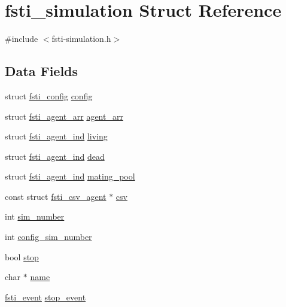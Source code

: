 \hypertarget{structfsti__simulation}{}\section{fsti\+\_\+simulation Struct Reference}
\label{structfsti__simulation}


{\ttfamily \#include $<$fsti-\/simulation.\+h$>$}

\subsection*{Data Fields}
\begin{DoxyCompactItemize}
\item 
struct \mbox{\hyperlink{structfsti__config}{fsti\+\_\+config}} \mbox{\hyperlink{structfsti__simulation_a093e3692784567c1afd416022ace5b62}{config}}
\item 
struct \mbox{\hyperlink{structfsti__agent__arr}{fsti\+\_\+agent\+\_\+arr}} \mbox{\hyperlink{structfsti__simulation_a897c352e69c8a3bd46c1a602d6380750}{agent\+\_\+arr}}
\item 
struct \mbox{\hyperlink{structfsti__agent__ind}{fsti\+\_\+agent\+\_\+ind}} \mbox{\hyperlink{structfsti__simulation_a303899c120552b30d6694f474351ac02}{living}}
\item 
struct \mbox{\hyperlink{structfsti__agent__ind}{fsti\+\_\+agent\+\_\+ind}} \mbox{\hyperlink{structfsti__simulation_a1e6af515eb855cb2fa8af101bd0f9cb8}{dead}}
\item 
struct \mbox{\hyperlink{structfsti__agent__ind}{fsti\+\_\+agent\+\_\+ind}} \mbox{\hyperlink{structfsti__simulation_a642fddbe7701bc70ce2a5e78c6c40f5a}{mating\+\_\+pool}}
\item 
const struct \mbox{\hyperlink{structfsti__csv__agent}{fsti\+\_\+csv\+\_\+agent}} $\ast$ \mbox{\hyperlink{structfsti__simulation_ac24c89a9b7794355c1f8395b7fc0b898}{csv}}
\item 
int \mbox{\hyperlink{structfsti__simulation_a679777bd22ba39d528f14a1dc3563233}{sim\+\_\+number}}
\item 
int \mbox{\hyperlink{structfsti__simulation_ac57d2ade56d4449859e872a4aae48236}{config\+\_\+sim\+\_\+number}}
\item 
bool \mbox{\hyperlink{structfsti__simulation_a5f892cad24c8c5a9ed5f82ffa6c722b5}{stop}}
\item 
char $\ast$ \mbox{\hyperlink{structfsti__simulation_abbbc0eedbde2da318017267617da40e1}{name}}
\item 
\mbox{\hyperlink{fsti-eventdefs_8h_abce6b23e84620b4f4433c952fa10f0b9}{fsti\+\_\+event}} \mbox{\hyperlink{structfsti__simulation_a736379cc4da7cf9e95fb33a44c865f2f}{stop\+\_\+event}}

\end{DoxyCompactItemize}
